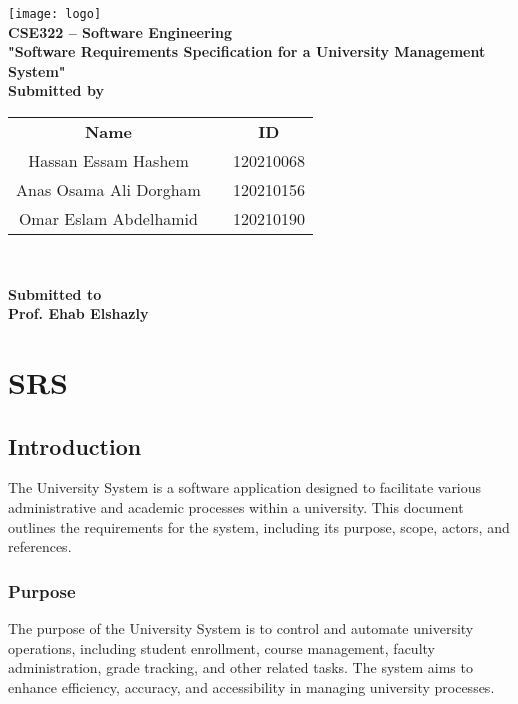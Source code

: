 \documentclass[12pt]{article}
\author{}
\date{}
\begin{document}
	\thispagestyle{empty}
	\begin{center}
		
		\texttt{[image: logo]}\\[0.5in]
		\LARGE \textbf {CSE322 – Software Engineering}\\[0.4in]
		\large \textbf {"Software Requirements Specification for a University Management System"}\\[0.9in]


		
		\LARGE \textbf {Submitted by}\\[0.3in]
		\LARGE
		{\begin{tabular}{ c c c }
				\textbf {Name} & & \textbf {ID}\\
				Hassan Essam Hashem & & 120210068\\
				Anas Osama Ali Dorgham & & 120210156 \\
				Omar Eslam Abdelhamid & & 120210190
			\end{tabular}\\[1.4in]
		}		\LARGE \textbf {Submitted to}\\[0.2in]
		\huge \textbf {Prof. Ehab Elshazly}
	\end{center}
	
	\newpage
	
	\setcounter{page}{2} 
	\large
	{\tableofcontents}
	\newpage
	\setcounter{page}{3}
	
	\section{SRS}
	
	\subsection{Introduction}
	
	The University System is a software application designed to facilitate various administrative and academic processes within a university. This document outlines the requirements for the system, including its purpose, scope, actors, and references.
	
	\subsubsection{Purpose}
	The purpose of the University System is to control and automate university operations, including student enrollment, course management, faculty administration, grade tracking, and other related tasks. The system aims to enhance efficiency, accuracy, and accessibility in managing university processes.
	
\end{document}
